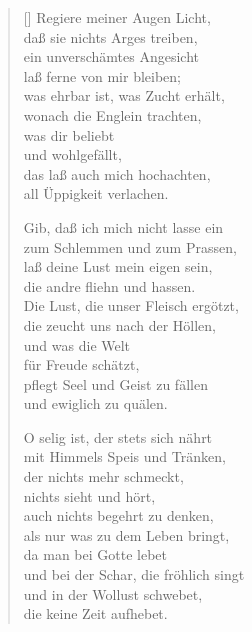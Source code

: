 \begin{multicols}{2}
\begin{verse}[\versewidth]
 Regiere meiner Augen Licht,\\
daß sie nichts Arges treiben,\\
ein unverschämtes Angesicht\\
laß ferne von mir bleiben;\\
was ehrbar ist, was Zucht erhält,\\
wonach die Englein trachten,\\
was dir beliebt\\
und wohlgefällt,\\
das laß auch mich hochachten,\\
all Üppigkeit verlachen.

 Gib, daß ich mich nicht lasse ein\\
zum Schlemmen und zum Prassen,\\
laß deine Lust mein eigen sein,\\
die andre fliehn und hassen.\\
Die Lust, die unser Fleisch ergötzt,\\
die zeucht uns nach der Höllen,\\
und was die Welt\\
für Freude schätzt,\\
pflegt Seel und Geist zu fällen\\
und ewiglich zu quälen.

 O selig ist, der stets sich nährt\\
mit Himmels Speis und Tränken,\\
der nichts mehr schmeckt,\\
nichts sieht und hört,\\
auch nichts begehrt zu denken,\\
als nur was zu dem Leben bringt,\\
da man bei Gotte lebet\\
und bei der Schar, die fröhlich singt\\
und in der Wollust schwebet,\\
die keine Zeit aufhebet.
   
\end{verse}
\end{multicols}
